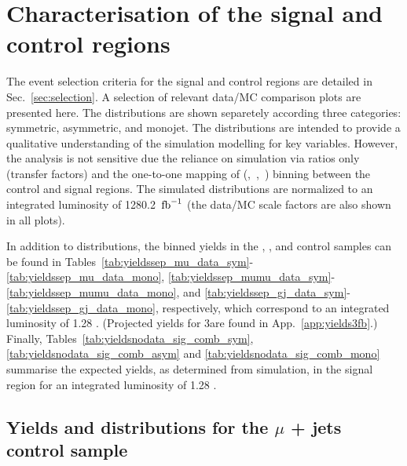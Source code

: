 \section{Characterisation of the signal and control regions}
\label{sec:yields}

The event selection criteria for the signal and control regions are
detailed in Sec.~\ref{sec:selection}. A selection of relevant data/MC
comparison plots are presented here. The distributions are shown
separetely according three \njet categories: symmetric, asymmetric,
and monojet. The distributions are intended to provide a qualitative
understanding of the simulation modelling for key variables. However,
the analysis is not sensitive due the reliance on simulation via
ratios only (\ie transfer factors) and the one-to-one mapping of
(\njet,~\nb,~\scalht) binning between the control and signal
regions. The simulated distributions are normalized to an integrated
luminosity of 1280.2~$\text{fb}^{-1}$ (the data/MC scale factors are also shown
in all plots).

In addition to distributions, the binned yields in the \mj, \mmj, and
\gj control samples can be found in
Tables~\ref{tab:yieldssep_mu_data_sym}-\ref{tab:yieldssep_mu_data_mono},
\ref{tab:yieldssep_mumu_data_sym}-\ref{tab:yieldssep_mumu_data_mono},
and \ref{tab:yieldssep_gj_data_sym}-\ref{tab:yieldssep_gj_data_mono},
respectively, which correspond to an integrated luminosity of 1.28
\ifb. (Projected yields for 3\ifb are found in
App.~\ref{app:yields3fb}.) Finally,
Tables~\ref{tab:yieldsnodata_sig_comb_sym},
\ref{tab:yieldsnodata_sig_comb_asym} and \ref{tab:yieldsnodata_sig_comb_mono} summarise the expected yields, as
determined from simulation, in the signal region for an integrated
luminosity of 1.28 \ifb.

\clearpage
\subsection{Yields and distributions for the $\mu$ + jets control sample}





